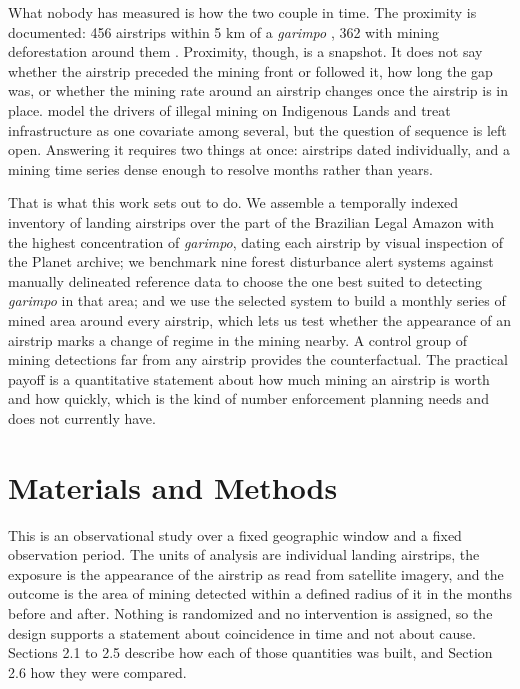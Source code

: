 \documentclass[11pt]{article}
\begin{document}
What nobody has measured is how the two couple in time. The proximity is documented: 456 airstrips within 5 km of a \textit{garimpo} \citep{mapbiomas2023pistas}, 362 with mining deforestation around them \citep{intercept2022}. Proximity, though, is a snapshot. It does not say whether the airstrip preceded the mining front or followed it, how long the gap was, or whether the mining rate around an airstrip changes once the airstrip is in place. \citet{silva2023} model the drivers of illegal mining on Indigenous Lands and treat infrastructure as one covariate among several, but the question of sequence is left open. Answering it requires two things at once: airstrips dated individually, and a mining time series dense enough to resolve months rather than years.

That is what this work sets out to do. We assemble a temporally indexed inventory of landing airstrips over the part of the Brazilian Legal Amazon with the highest concentration of \textit{garimpo}, dating each airstrip by visual inspection of the Planet archive; we benchmark nine forest disturbance alert systems against manually delineated reference data to choose the one best suited to detecting \textit{garimpo} in that area; and we use the selected system to build a monthly series of mined area around every airstrip, which lets us test whether the appearance of an airstrip marks a change of regime in the mining nearby. A control group of mining detections far from any airstrip provides the counterfactual. The practical payoff is a quantitative statement about how much mining an airstrip is worth and how quickly, which is the kind of number enforcement planning needs and does not currently have.


\section{Materials and Methods}

This is an observational study over a fixed geographic window and a fixed observation period. The units of analysis are individual landing airstrips, the exposure is the appearance of the airstrip as read from satellite imagery, and the outcome is the area of mining detected within a defined radius of it in the months before and after. Nothing is randomized and no intervention is assigned, so the design supports a statement about coincidence in time and not about cause. Sections 2.1 to 2.5 describe how each of those quantities was built, and Section 2.6 how they were compared.
\end{document}
